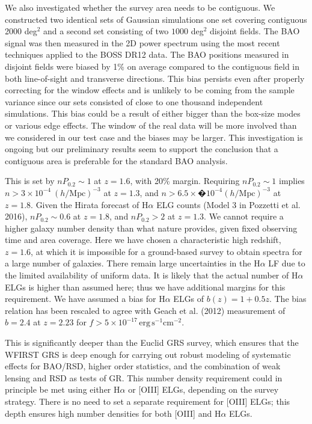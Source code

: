  We also investigated whether the survey area needs to be contiguous. We
 constructed two identical sets of Gaussian simulations one set covering
 contiguous 2000 deg$^2$ and a second set consisting of two $1000$ deg$^2$
 disjoint fields. The BAO signal was then measured in the 2D power spectrum using the
 most recent techniques applied to the BOSS DR12 data. The BAO positions measured
 in disjoint fields were biased by 1\% on average compared to the contiguous
 field in both line-of-sight and transverse directions. This bias persists even
 after properly correcting for the window effects and is unlikely to be coming
 from the sample variance since our sets consisted of close to one thousand
 independent simulations. This bias could be a result of either bigger than the
 box-size modes or various edge effects. The window of the real data will be more
 involved than we considered in our test case and the biases may be larger. This
 investigation is ongoing but our preliminary results seem to support the
 conclusion that a contiguous area is preferable for the standard BAO analysis.


 This is set by $nP_{0.2} \sim1$ at $z=1.6$, with 20\% margin. Requiring $nP_{0.2}
 \sim1$ implies $n> 3\times10^{-4}\ (h/\mathrm{Mpc})^{-3}$ at $z=1.3$, and $n >
 6.5\times �10^{-4} (h/\mathrm{Mpc})^{-3}$ at $z=1.8$. Given the Hirata
 forecast of H$\alpha$ ELG counts (Model 3 in Pozzetti et al. 2016), $nP_{0.2}\sim0.6$ at $z=1.8$,
 and $nP_{0.2}>2$ at $z=1.3$.  We cannot require a higher galaxy number density than
 what nature provides, given fixed observing time and area coverage. Here we have
 chosen a characteristic high redshift, $z=1.6$, at which it is impossible for a
 ground-based survey to obtain spectra for a large number of galaxies. There
 remain large uncertainties in the H$\alpha$ LF due to the limited availability of
 uniform data. It is likely that the actual number of H$\alpha$ ELGs is higher than
 assumed here; thus we have additional margins for this requirement. We have
 assumed a bias for H$\alpha$ ELGs of $b(z) = 1+0.5z$. The bias relation has been rescaled
 to agree with Geach et al. (2012) measurement of $b=2.4$ at $z=2.23$ for $f >
 5\times 10^{-17} \, \mathrm{ erg\,s^{-1}cm^{-2}}$.

 This is significantly deeper than the Euclid GRS survey, which ensures that the
 WFIRST GRS is deep enough for carrying out robust modeling of systematic effects
 for BAO/RSD, higher order statistics, and the combination of weak lensing and
 RSD as tests of GR. This number density requirement could in principle be met
 using either H$\alpha$ or [OIII] ELGs, depending on the survey strategy. There is no
 need to set a separate requirement for [OIII] ELGs; this depth ensures high
 number densities for both [OIII] and H$\alpha$ ELGs.

